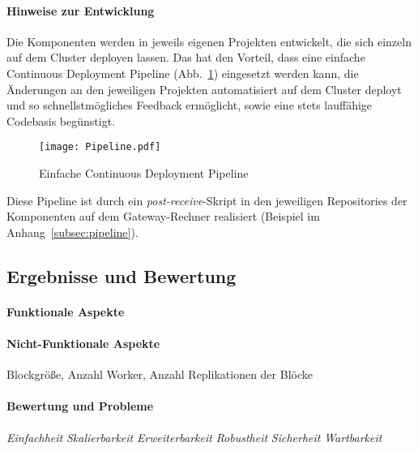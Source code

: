 \paragraph{Hinweise zur Entwicklung}
Die Komponenten werden in jeweils eigenen Projekten entwickelt, die sich einzeln auf dem Cluster deployen lassen. Das hat den Vorteil, dass eine einfache Continuous Deployment Pipeline (Abb.~\ref{figure:cd_pipeline}) eingesetzt werden kann, die Änderungen an den jeweiligen Projekten automatisiert auf dem Cluster deployt und so schnellstmögliches Feedback ermöglicht, sowie eine stets lauffähige Codebasis begünstigt.\\

\begin{figure}[ht!]
	\centering
  \texttt{[image: Pipeline.pdf]}
	\caption{Einfache Continuous Deployment Pipeline}
	\label{figure:cd_pipeline}
\end{figure}

Diese Pipeline ist durch ein \textit{post-receive}-Skript in den jeweiligen Repositories der Komponenten auf dem Gateway-Rechner realisiert (Beispiel im Anhang~\ref{subsec:pipeline}).\\

\subsection{Ergebnisse und Bewertung}
\paragraph{Funktionale Aspekte}
\paragraph{Nicht-Funktionale Aspekte}
Blockgröße, Anzahl Worker, Anzahl Replikationen der Blöcke
\paragraph{Bewertung und Probleme}

\textit{Einfachheit}
\textit{Skalierbarkeit}
\textit{Erweiterbarkeit}
\textit{Robustheit}
\textit{Sicherheit}
\textit{Wartbarkeit}
